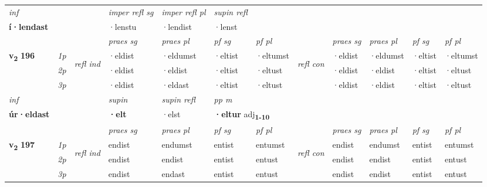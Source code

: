 \begin{longtable}[l]{X>{\footnotesize\itshape}llXXXXlXXXX}
   {\textit{inf}} & &   & \textit{imper refl sg} & \textit{imper refl pl}   & \textit{supin refl}  \\*
  {\textbf{í\allowbreak ·lendast}} & &   & ·lenstu & ·lendist   & ·lenst  \\*

\midrule

 & &   & \textit{praes sg}  & \textit{praes pl}    & \textit{ pf sg} & \textit{pf pl} & & \textit{praes sg}  & \textit{praes pl}    & \textit{pf sg} & \textit{pf pl }  \\ \cmidrule{4-7} \cmidrule{9-12}
 \multirow{2}{*}{{{\textbf{v{\textsubscript{2}}} \Large{\textbf{196}}}}}  & 1p & \multirow{3}{*}{\begin{turn}{90}\textit{refl ind}\end{turn}}  & ·eldist & ·eldumst & ·eltist & ·eltumst & \multirow{3}{*}{\begin{turn}{90}\textit{refl con}\end{turn}}  &·eldist & ·eldumst & ·eltist & ·eltumst \\*
 & 2p &  & ·eldist & ·eldist & ·eltist & ·eltust & &·eldist & ·eldist & ·eltist & ·eltust \\*
 & 3p  & & ·eldist & ·eldast & ·eltist & ·eltust & & ·eldist & ·eldist& ·eltist & ·eltust \\*
\cmidrule{4-7} \cmidrule{9-12}

   {\textit{inf}} & &      & \textit{supin} & \textit{supin refl} & \textit{pp m} \\*
  {\textbf{úr\allowbreak ·eldast}} & &      &  \textbf{·elt} & ·elst & \multicolumn{2}{l}{\textbf{·eltur} adj\textbf{\textsubscript{1-10}}} \\*

\midrule

 & &   & \textit{praes sg}  & \textit{praes pl}    & \textit{ pf sg} & \textit{pf pl} & & \textit{praes sg}  & \textit{praes pl}    & \textit{pf sg} & \textit{pf pl }  \\ \cmidrule{4-7} \cmidrule{9-12}
 \multirow{2}{*}{{{\textbf{v{\textsubscript{2}}} \Large{\textbf{197}}}}}  & 1p & \multirow{3}{*}{\begin{turn}{90}\textit{refl ind}\end{turn}}  & endist & endumst & entist & entumst & \multirow{3}{*}{\begin{turn}{90}\textit{refl con}\end{turn}}  &endist & endumst & entist & entumst \\*
 & 2p &  & endist & endist & entist & entust & &endist & endist & entist & entust \\*
 & 3p  & & endist & endast & entist & entust & & endist & endist& entist & entust \\*
\cmidrule{4-7} \cmidrule{9-12}


\end{longtable}
